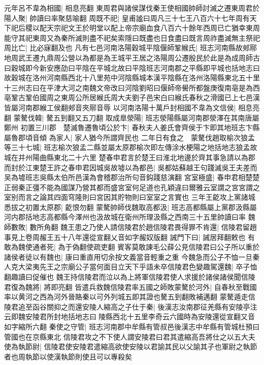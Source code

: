 元年呂不韋為相國|{
	相息亮翻}
東周君與諸侯謀伐秦王使相國帥師討滅之遷東周君於陽人聚|{
	帥讀曰率聚慈喻翻}
周既不祀|{
	皇甫謐曰周凡三十七王八百六十七年周有天下祀后稷以配天宗祀文王於明堂以配上帝宗廟血食八百六十餘年西周已亡猶幸東周能守其祀東周又為秦所滅則盡不祀矣索隱曰既盡也日食盡曰既言周祚盡滅無主祭祀}
周比亡|{
	比必寐翻及也}
凡有七邑河南洛陽穀城平陰偃師鞏緱氏|{
	班志河南縣故郟鄏地周武王遷九鼎周公營以為都是為王城平王居之洛陽周公遷殷民於此是為成周師古曰穀城即今新安應劭曰平陰在平城北故曰平陰班志河南郡之平縣即平城也括地志曰故穀城在洛州河南縣西北十八里苑中河陰縣城本漢平陰縣在洛州洛陽縣東北五十里十三州志曰在平津大河之南魏文帝改曰河陰劉昭曰偃師帝嚳所都盤庚復南亳是為西亳鞏古鞏伯國周之東周公所居緱氏周大夫劉子邑宋白曰緱氏春秋之滑國已上七邑漢皆屬河南郡緱工侯翻郟音夾鄏音辱}
以河南洛陽十萬戶封相國不韋為文信侯|{
	相息亮翻}
蒙驁伐韓|{
	驁五到翻又五刀翻}
取成臯滎陽|{
	班志滎陽縣屬河南郡滎澤在其南唐屬鄭州}
初置三川郡　楚滅魯遷魯頃公於卞|{
	春秋夫人姜氏會齊侯于卞即其地班志卞縣屬魯郡頃音傾}
為家人|{
	家人猶今所謂齊民也}
二年日有食之　蒙驁伐趙取榆次狼孟等三十七城|{
	班志榆次狼孟二縣並屬太原郡榆次即左傳涂水梗陽之地括地志狼孟故城在并州陽曲縣東北二十六里}
楚春申君言於楚王曰淮北地邊於齊其事急請以為郡而封於江東楚王許之春申君因城吳故墟以為都邑|{
	吳都姑蘇越王句踐滅吳王夫差而吴為墟班志吳縣太伯所邑漢為會稽郡治所句音鈎踐慈演翻}
宮室極盛|{
	春申君相楚楚正弱秦正彊不能為國謀乃營其都而盛宮室何足道也孔穎違曰爾雅云室謂之宮宮謂之室别而言之論其四面穹隆則曰宮因其貯物則曰室室之言實也}
三年王齕攻上黨諸城悉拔之初置太原郡|{
	齕恨勿翻}
蒙驁帥師伐魏取高都汲|{
	班志高都縣屬上黨郡汲縣屬河内郡括地志高都縣今澤州也汲故城在衛州所理汲縣之西南三十五里帥讀曰率}
魏師數敗|{
	數所角翻}
魏王患之乃使人請信陵君於趙信陵君畏得罪不肯還|{
	信陵君留趙事見上卷周赧王五十八年還從宣翻乂音如字赧奴版翻}
誡門下曰|{
	誡居拜翻敕也}
有敢為魏使通者死|{
	為于偽翻使疏吏翻}
賓客莫敢諫毛公薛公見信陵君曰公子所以重於諸侯者徒以有魏也|{
	康曰重直用切余按文義當音輕重之重}
今魏急而公子不恤一旦秦人克大梁夷先王之宗廟公子當何面目立天下乎語未卒信陵君色變趣駕還魏|{
	卒子恤翻趣讀曰促催也}
魏王持信陵君而泣以為上將軍信陵君使人求援於諸侯諸侯聞信陵君復為魏將|{
	將即亮翻}
皆遣兵救魏信陵君率五國之師敗蒙驁於河外|{
	自春秋至戰國率以黄河之西為河外晉賂秦以可外列城五即其證也驁五到翻敗補邁翻}
蒙驁遁走信陵君追至函谷關抑之而還安陵人縮高之子仕于秦|{
	後漢志汝南郡征羌縣有安陵亭注云即魏安陵君所封地括地志曰陵縣西北十五里李奇云六國時為安陵還從宣翻又音如字縮所六翻}
秦使之守管|{
	班志河南郡中牟縣有管叔邑後漢志中牟縣有管城杜預曰管國也在京縣東北}
信陵君攻之不下使人謂安陵君曰君其遣縮高吾將仕之以五大夫使為執節尉|{
	信陵君使安陵君遣縮高欲使安陵以君諭其民以父諭其子也軍尉之執節者也周執節以使漢執節則使且可以專殺矣}
